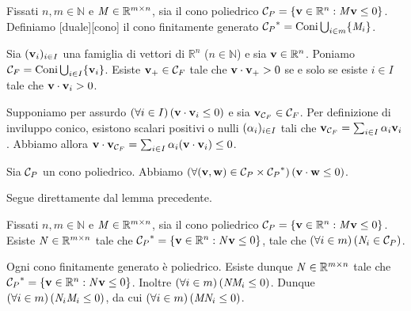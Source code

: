 \begin{Definition}
	Fissati $n, m \in \mathbb{N}$ e $\mathit{M} \in \mathbb{R}^{m \times n}$, sia il cono poliedrico $\mathcal{C}_P = \lbrace \mathbf{v} \in \mathbb{R}^n : \mathit{M} \mathbf{v} \leq 0 \rbrace$. Definiamo [duale][cono] il cono finitamente generato ${{\mathcal{C}_P}^*} = \operatorname{Coni}{\bigcup_{i \in m} \lbrace \mathit{M}_i \rbrace}$.
\end{Definition}
\begin{Lemma}
	Sia $(\mathbf{v}_i)_{i \in I}$ una famiglia di vettori di $\mathbb{R}^n$ ($n \in \mathbb{N}$) e sia $\mathbf{v} \in \mathbb{R}^n$. Poniamo ${\mathcal{C}_F} = \operatorname{Coni}{\bigcup_{i \in I} \lbrace \mathbf{v}_i \rbrace}$. Esiste $\mathbf{v}_+ \in {\mathcal{C}_F}$ tale che $\mathbf{v} \cdot \mathbf{v}_+ > 0$ se e solo se esiste $i \in I$ tale che $\mathbf{v} \cdot \mathbf{v}_i > 0$.
\end{Lemma}
\Proof Supponiamo per assurdo $\left ( \forall i \in I \right ) \left ( \mathbf{v} \cdot \mathbf{v}_i \leq 0 \right )$ e sia $\mathbf{v}_{\mathcal{C}_F} \in {\mathcal{C}_F}$. Per definizione di inviluppo conico, esistono scalari positivi o nulli $(\alpha_i)_{i \in I}$ tali che $\mathbf{v}_{\mathcal{C}_F} = \sum_{i \in I} \alpha_i\mathbf{v}_i$. Abbiamo allora $\mathbf{v} \cdot \mathbf{v}_{\mathcal{C}_F} = \sum_{i \in I} \alpha_i(\mathbf{v} \cdot \mathbf{v}_i) \leq 0$. \EndProof
\begin{Theorem}
	Sia $\mathcal{C}_P$ un cono poliedrico. Abbiamo $\left ( \forall (\mathbf{v},\mathbf{w}) \in \mathcal{C}_P \times {{\mathcal{C}_P}^*} \right ) \left ( \mathbf{v} \cdot \mathbf{w} \leq 0 \right )$.
\end{Theorem}
\Proof Segue direttamente dal lemma precedente. \EndProof
\begin{Lemma}
	Fissati $n, m \in \mathbb{N}$ e $\mathit{M} \in \mathbb{R}^{m \times n}$, sia il cono poliedrico $\mathcal{C}_P = \lbrace \mathbf{v} \in \mathbb{R}^n : \mathit{M} \mathbf{v} \leq 0 \rbrace$. Esiste $\mathit{N} \in \mathbb{R}^{m \times n}$ tale che ${{\mathcal{C}_P}^*} = \lbrace \mathbf{v} \in \mathbb{R}^n: \mathit{N} \mathbf{v} \leq 0 \rbrace$, tale che $\left ( \forall i \in m \right ) \left ( \mathit{N}_i \in \mathcal{C}_P \right )$.
\end{Lemma}
\Proof Ogni cono finitamente generato \`e poliedrico. Esiste dunque $\mathit{N} \in \mathbb{R}^{m \times n}$ tale che ${{\mathcal{C}_P}^*} = \lbrace \mathbf{v} \in \mathbb{R}^n: \mathit{N} \mathbf{v} \leq 0 \rbrace$. Inoltre $\left ( \forall i \in m \right ) \left ( \mathit{N} \mathit{M}_i \leq 0 \right )$. Dunque $\left ( \forall i \in m \right ) \left ( \mathit{N}_i \mathit{M}_i \leq 0 \right )$, da cui $\left ( \forall i \in m \right ) \left ( \mathit{M} \mathit{N}_i \leq 0 \right )$. \EndProof

